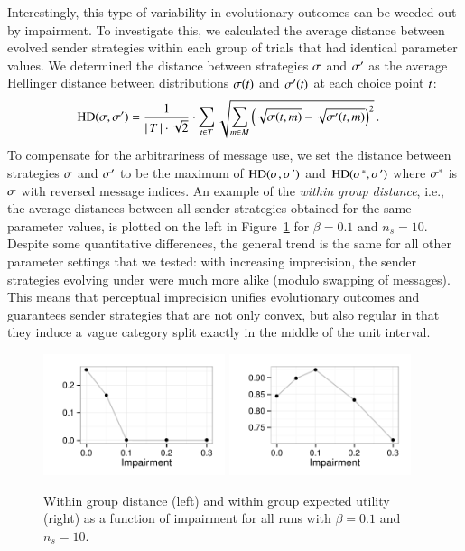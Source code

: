 \documentclass[fleqn,reqno,10pt]{article}
\newcommand{\rdd}{\acro{rdd}} %
\newcommand{\toler}{\ensuremath{\beta}} %
\begin{document}
Interestingly, this type of variability in evolutionary outcomes can
be weeded out by impairment. To investigate this, we calculated the average
distance between evolved sender strategies within each group of trials
that had identical parameter values. We determined the distance
between strategies $\sigma$ and $\sigma'$ as the average Hellinger
distance between distributions $\sigma(t)$ and
$\sigma'(t)$ at each choice point $t$:
\begin{align*}
  \text{HD}(\sigma,\sigma') & = \frac{1}{{\left \lvert \, T \, \right\rvert \cdot
     \sqrt{2}}} \cdot  \sum_{t \in T} 
 \sqrt{\sum_{m \in  M}
         \left ( \sqrt{\sigma(t,m)} -
         \sqrt{\sigma'(t,m)} \right )^2 }\,.
\end{align*}
To compensate for the arbitrariness of message use, we set the
distance between strategies $\sigma$ and $\sigma'$ to be the maximum
of $\text{HD}(\sigma,\sigma')$ and $\text{HD}(\sigma^*,\sigma')$
where $\sigma^*$ is $\sigma$ with reversed message indices. An example of the
\emph{within group distance}, i.e., the average distances between all
sender strategies obtained for the same parameter values, is plotted
on the left in Figure~\ref{fig:GroupMeasures} for $\beta =
0.1$ and $n_s = 10$. Despite some quantitative differences, the
general trend is the same for all other parameter settings that we tested:
with increasing imprecision, the sender strategies evolving under \rdd
were much more alike (modulo swapping of messages). This means that
perceptual imprecision unifies evolutionary outcomes and guarantees
sender strategies that are not only convex, but also regular in that
they induce a vague category split exactly in the middle of the unit
interval.

\begin{figure}
  \centering

    \includegraphics[width=0.475\textwidth]{plots/WithinGroupDistanceConcise.pdf}
    \hfill
    \includegraphics[width=0.475\textwidth]{plots/WithinGroupEUConcise.pdf}

    \caption{Within group distance (left) and within group expected
      utility (right) as a function of impairment for all runs with
      $\toler = 0.1$ and $n_s = 10$.}
  \label{fig:GroupMeasures}
\end{figure}
\end{document}
